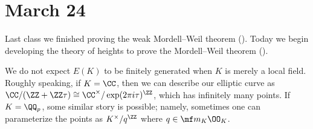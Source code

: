 \documentclass[../notes.tex]{subfiles}
\begin{document}
\section{March 24}

Last class we finished proving the weak Mordell--Weil theorem (). Today we begin developing the theory of heights to prove the Mordell--Weil theorem ().
\begin{remark}
	We do not expect $E(K)$ to be finitely generated when $K$ is merely a local field. Roughly speaking, if $K=\CC$, then we can describe our elliptic curve as $\CC/(\ZZ+\ZZ\tau)\cong\CC^\times/\exp(2\pi i\tau)^\ZZ$, which has infinitely many points. If $K=\QQ_p$, some similar story is possible; namely, sometimes one can parameterize the points as $K^\times/q^\ZZ$ where $q\in\mf m_K\OO_K$.
\end{remark}
\end{document}
